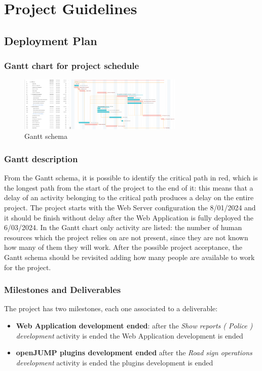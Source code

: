\section{Project Guidelines}
\subsection{Deployment Plan}

\subsubsection{Gantt chart for project schedule}

    \begin{figure}[h]
        \centering
        \includegraphics[width=0.7\textwidth]{images/GANTT.png}
        \caption{Gantt schema}
       \end{figure}

\subsubsection{Gantt description}
From the Gantt schema, it is possible to identify the critical path in red, which is the longest path from the start of the project to the end of it: this means that a delay of an activity belonging to the critical path produces a delay on the entire project.
The project starts with the Web Server configuration the 8/01/2024 and it should be finish without delay after the Web Application is fully deployed the 6/03/2024.
In the Gantt chart only activity are listed: the number of human resources which the project relies on are not present, since they are not known how many of them they will work.
After the possible project acceptance, the Gantt schema should be revisited adding how many people are available to work for the project.

\subsubsection{Milestones and Deliverables}
The project has two milestones, each one associated to a deliverable:
\begin{itemize}
    \item \textbf{Web Application development ended}: after the \textit{Show reports ( Police ) development} activity is ended the Web Application development is ended
    \item \textbf{openJUMP plugins development ended} after the \textit{Road sign operations development} activity is ended the plugins development is ended
\end{itemize}

